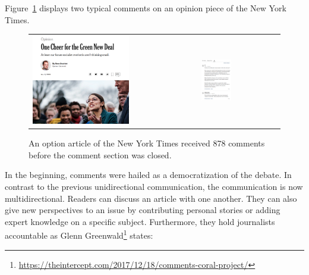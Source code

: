 Figure~\ref{fig:nyt_article_comment} displays two typical comments on an opinion piece of the New York Times.

\begin{figure}[h]
\begin{tabular}{ll}
\includegraphics[width=0.6\textwidth]{images/intro/nyt_article.png}
&
\includegraphics[width=0.4\textwidth]{images/intro/nyt_comment1.png}
\end{tabular}
\caption[Caption for LOF]{An option article of the New York Times received 878 comments before the comment section was closed.\protect\footnotemark}
\label{fig:nyt_article_comment}
\end{figure}


In the beginning, comments were hailed as a democratization of the debate. In contrast to the previous unidirectional communication, the communication is now multidirectional. Readers can discuss an article with one another. They can also give new perspectives to an issue by contributing personal stories or adding expert knowledge on a specific subject. Furthermore, they hold journalists accountable as Glenn Greenwald\footnote{\url{https://theintercept.com/2017/12/18/comments-coral-project/}} states:

